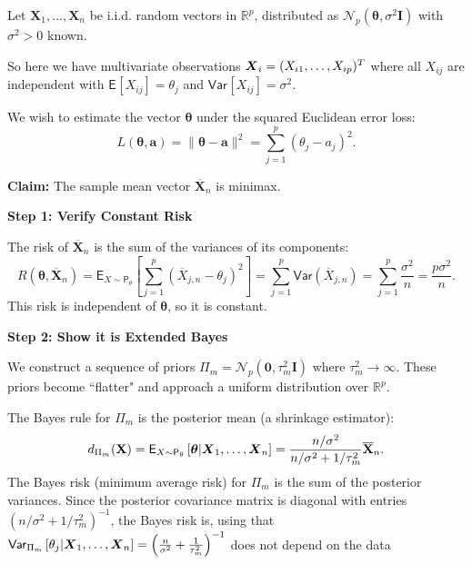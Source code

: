 \begin{ex}
\label{ex:multivariate_gaussian}

Let \(\mathbf{X}_1, \dots, \mathbf{X}_n\) be i.i.d. random vectors in \(\mathbb{R}^p\), distributed as \(\mathcal{N}_p(\boldsymbol{\theta}, \sigma^2 \mathbf{I})\) with \(\sigma^2 > 0\) known.

So here we have multivariate observations \(\boldsymbol{X}_{i} = (X_{i1}, \dots, X_{ip})^{T}\) where all \(X_{ij}\) are independent with \(\mathsf{E}_{}\left[X_{ij}\right] =\theta_{j}\) and \(\mathsf{Var}_{}\left[X_{ij}\right] =\sigma^2\).

We wish to estimate the vector \(\boldsymbol{\theta}\) under the squared Euclidean error loss:
\[ L(\boldsymbol{\theta}, \mathbf{a}) = \|\boldsymbol{\theta} - \mathbf{a}\|^2 = \sum_{j=1}^{p} (\theta_j - a_j)^2. \]

\textbf{Claim:} The sample mean vector \(\overline{\mathbf{X}}_n\) is minimax.

\textbf{Step 1: Verify Constant Risk}

The risk of \(\overline{\mathbf{X}}_n\) is the sum of the variances of its components:
\[
R(\boldsymbol{\theta}, \overline{\mathbf{X}}_n) = \mathsf{E}_{X\sim \mathsf{P}_{\theta}} \left[ \sum_{j=1}^p (\overline{X}_{j,n} - \theta_j)^2 \right] = \sum_{j=1}^p \mathsf{Var}(\overline{X}_{j,n}) = \sum_{j=1}^p \frac{\sigma^2}{n} = \frac{p\sigma^2}{n}.
\]
This risk is independent of \(\boldsymbol{\theta}\), so it is constant.

\textbf{Step 2: Show it is Extended Bayes}

We construct a sequence of priors \(\Pi_m = \mathcal{N}_p(\mathbf{0}, \tau_m^2 \mathbf{I})\) where \(\tau_m^2 \to \infty\). These priors become ``flatter" and approach a uniform distribution over \(\mathbb{R}^p\).

The Bayes rule for \(\Pi_m\) is the posterior mean (a shrinkage estimator):
\[
d_{\Pi_m}(\mathbf{X}) = \mathsf{E}_{X\sim \mathsf{P}_{\theta}}\left[\boldsymbol{\theta}|\boldsymbol{X}_{1}, \dots, \boldsymbol{X}_{n}\right] = \frac{n/\sigma^2}{n/\sigma^2 + 1/\tau_m^2} \overline{\mathbf{X}}_n.
\]
The Bayes risk (minimum average risk) for \(\Pi_m\) is the sum of the posterior variances. Since the posterior covariance matrix is diagonal with entries \((n/\sigma^2 + 1/\tau_m^2)^{-1}\), the Bayes risk is, using that \(\mathsf{Var}_{\Pi_{m}}\left[\theta_{j}|\boldsymbol{X}_{1}, \dots, \boldsymbol{X}_{n}\right] = \left( \frac{n}{\sigma^2}+\frac{1}{\tau ^2_{m}} \right)^{-1}  \) does not depend on the data


\end{ex}
